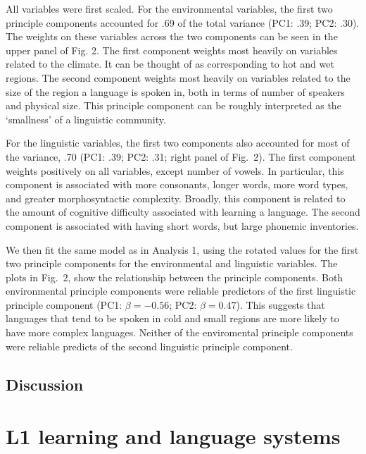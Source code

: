 \documentclass[10pt,letterpaper]{article}
\begin{document}
All variables were first scaled. For the environmental variables, the first two principle components accounted for  .69 of the total variance (PC1: .39; PC2: .30).  The weights on these variables across the two components can be seen in the upper panel of Fig. 2. The first component  weights most heavily on variables related to the climate. It can be thought of as corresponding to hot and wet regions. The second component weights most heavily on variables related to the size of the region a language is spoken in, both in terms of number of speakers and physical size. This principle component can be roughly interpreted as the `smallness' of a linguistic community.

For the linguistic variables, the first two components also accounted for most of the variance, .70 (PC1: .39; PC2: .31; right panel of Fig.\ 2). The first component weights positively on all variables, except number of vowels. In particular, this component is associated with more consonants, longer words, more word types, and greater morphosyntactic complexity. Broadly, this component is related to the amount of cognitive difficulty associated with learning a language. The second component is associated with having short words, but large phonemic inventories. 

We then fit the same model as in Analysis 1,  using the rotated values for the first two principle components for the environmental and linguistic variables. The plots in Fig.\ 2, show the relationship between the principle components. Both environmental principle components were reliable predictors of the first linguistic principle component (PC1: $\beta=-0.56$; PC2: $\beta=0.47$). This suggests that languages that tend to be  spoken in cold and small regions are more likely to have more complex languages. Neither of the enviromental principle components were reliable predicts of the second linguistic principle component.


\subsection{Discussion}



\section{L1 learning and language systems}
\cite{luniewska2015ratings}

\end{document}
